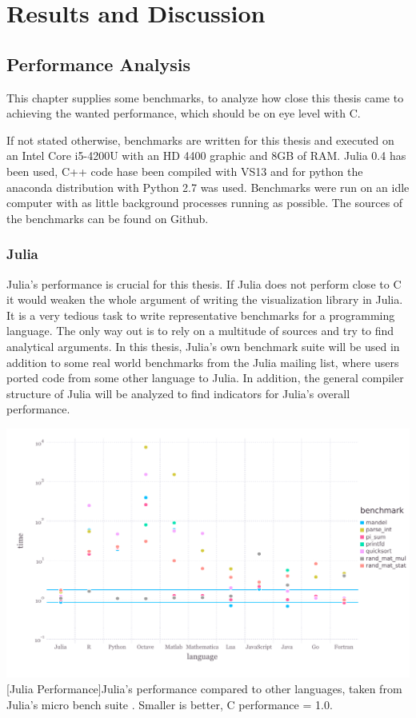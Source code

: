 \section{Results and Discussion}

\subsection{Performance Analysis}
This chapter supplies some benchmarks, to analyze how close this thesis came to achieving the wanted performance, which should be on eye level with C.

If not stated otherwise, benchmarks are written for this thesis and executed on an Intel Core i5-4200U with an HD 4400 graphic and 8GB of RAM.
Julia 0.4 has been used, C++ code hase been compiled with VS13 and for python the anaconda distribution with Python 2.7 was used.
Benchmarks were run on an idle computer with as little background processes running as possible.
The sources of the benchmarks can be found on Github.

\subsubsection{Julia}

Julia's performance is crucial for this thesis. 
If Julia does not perform close to C it would weaken the whole argument of writing the visualization library in Julia.
It is a very tedious task to write representative benchmarks for a programming language. 
The only way out is to rely on a multitude of sources and try to find analytical arguments.
In this thesis, Julia's own benchmark suite will be used in addition to some real world benchmarks from the Julia mailing list, where users ported code from some other language to Julia.
In addition, the general compiler structure of Julia will be analyzed to find indicators for Julia's overall performance.

\vspace{1em}
\begin{minipage}{\linewidth}
    \centering
    \includegraphics[width=0.9\linewidth]{graphics/juliabench.pdf}
    [Julia Performance]{Julia's performance compared to other languages, taken from Julia's micro bench suite \cite{JuliaBench}. Smaller is better, C performance = 1.0.}
    \label{fig:juliabench}
\end{minipage}

